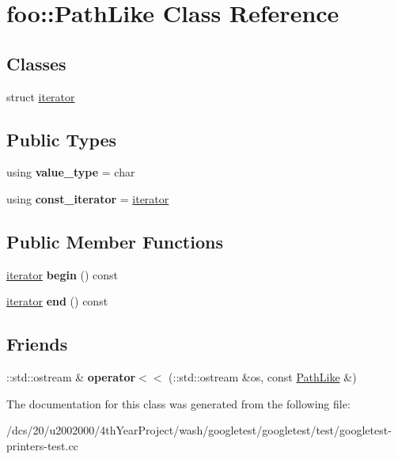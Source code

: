 \hypertarget{classfoo_1_1PathLike}{}\section{foo\+:\+:Path\+Like Class Reference}
\label{classfoo_1_1PathLike}
\subsection*{Classes}
\begin{DoxyCompactItemize}
\item 
struct \mbox{\hyperlink{structfoo_1_1PathLike_1_1iterator}{iterator}}
\end{DoxyCompactItemize}
\subsection*{Public Types}
\begin{DoxyCompactItemize}
\item 
\mbox{\label{classfoo_1_1PathLike_aa828aab5ad4071dddf489067e7e06c5e}} 
using {\bfseries value\+\_\+type} = char
\item 
\mbox{\label{classfoo_1_1PathLike_adada0ee7aeec173026717604e6264b4c}} 
using {\bfseries const\+\_\+iterator} = \mbox{\hyperlink{structfoo_1_1PathLike_1_1iterator}{iterator}}
\end{DoxyCompactItemize}
\subsection*{Public Member Functions}
\begin{DoxyCompactItemize}
\item 
\mbox{\label{classfoo_1_1PathLike_a7ca8b63139fd6fcada55fbf13ccf9c83}} 
\mbox{\hyperlink{structfoo_1_1PathLike_1_1iterator}{iterator}} {\bfseries begin} () const
\item 
\mbox{\label{classfoo_1_1PathLike_aca85cd005890f1d19f416ca7e2c95f02}} 
\mbox{\hyperlink{structfoo_1_1PathLike_1_1iterator}{iterator}} {\bfseries end} () const
\end{DoxyCompactItemize}
\subsection*{Friends}
\begin{DoxyCompactItemize}
\item 
\mbox{\label{classfoo_1_1PathLike_ab5544a5497a8a470802bd8fcf97c49da}} 
\+::std\+::ostream \& {\bfseries operator$<$$<$} (\+::std\+::ostream \&os, const \mbox{\hyperlink{classfoo_1_1PathLike}{Path\+Like}} \&)
\end{DoxyCompactItemize}


The documentation for this class was generated from the following file\+:\begin{DoxyCompactItemize}
\item 
/dcs/20/u2002000/4th\+Year\+Project/wash/googletest/googletest/test/googletest-\/printers-\/test.\+cc\end{DoxyCompactItemize}
